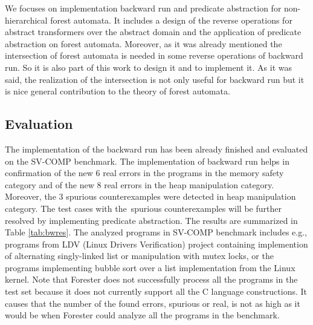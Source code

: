 \documentclass[fleqn,11pt]{ExcelAtFIT} %
\begin{document}
We focuses on implementation backward run and predicate abstraction
for non-hierarchical forest automata.
It includes a design of the reverse operations for abstract transformers over
the abstract domain and the application of predicate abstraction on forest automata.
Moreover, as it was already mentioned the intersection of forest automata is needed in some reverse
operations of backward run.
So it is also part of this work to design it and to implement it.
As it was said, the realization of the intersection is not only useful for backward run but
it is nice general contribution to the theory of forest automata.

\begin{comment}
We mentioned that this work implements either backward run and predicate abstraction only for
non-hierarchical forest automata.
Such extension for hierarchical forest automata is definitely a challenging issue for future work
that will be done next after finishing the implementation of basic predicate abstraction.
\end{comment}

\subsection{Evaluation}

The implementation of the backward run has been already finished and evaluated on the SV-COMP benchmark.
The implementation of backward run helps in confirmation of the new $6$ real errors in the programs in the memory safety category and
of the new $8$ real errors in the heap manipulation category.
Moreover, the $3$ spurious counterexamples were detected in heap manipulation category.
The test cases with the~spurious counterexamples will be further resolved by implementing predicate
abstraction.
The results are summarized in Table \ref{tab:bwres}.
The analyzed programs in SV-COMP benchmark includes e.g., programs from LDV (Linux Drivers Verification) project
containing implemention of alternating singly-linked list or manipulation with mutex locks, or the programs
implementing bubble sort over a list implementation from the Linux kernel.
Note that Forester does not successfully process all the programs in the test set
because it does not currently support all the C language constructions.
It causes that the number of the found errors, spurious or real, is not as high as it would be when
Forester could analyze all the programs in the benchmark.
\end{document}
